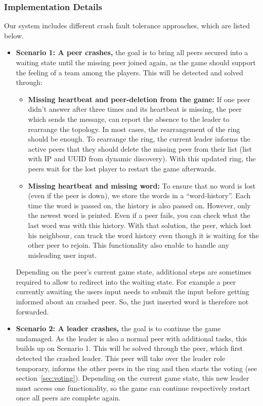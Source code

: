 \documentclass[runningheads]{llncs}
\begin{document}
            \subsubsection{Implementation Details}
            Our system includes different crash fault tolerance approaches, which are listed below.
            \begin{itemize}
                \item \textbf{Scenario 1: A peer crashes,} the goal is to bring all peers secured into a waiting state until the missing peer joined again, as the game should support the feeling of a team among the players. This will be detected and solved through:
                \begin{itemize}
                    \item \textbf{Missing heartbeat and peer-deletion from the game:} If one peer didn't answer after three times and its heartbeat is missing, the peer which sends the message, can report the absence to the leader to rearrange the topology. In most cases, the rearrangement of the ring should be enough. To rearrange the ring, the current leader informs the active peers that they should delete the missing peer from their list (list with IP and UUID from dynamic discovery). With this updated ring, the peers wait for the lost player to restart the game afterwards.
                    \item \textbf{Missing heartbeat and missing word:} To ensure that no word is lost (even if the peer is down), we store the words in a \enquote{word-history}. Each time the word is passed on, the history is also passed on. However, only the newest word is printed. Even if a peer fails, you can check what the last word was with this history. With that solution, the peer, which lost his neighbour, can track the word history even though it is waiting for the other peer to rejoin. This functionality also enable to handle any misleading user input.
                \end{itemize}
                Depending on the peer's current game state, additional steps are sometimes required to allow to redirect into the waiting state. For example a peer currently awaiting the users input needs to submit the input before getting informed about an crashed peer. So, the just inserted word is therefore not forwarded.
                \item \textbf{Scenario 2: A leader crashes,} the goal is to continue the game undamaged. As the leader is also a normal peer with additional tasks, this builds up on Scenario 1. This will be solved through the peer, which first detected the crashed leader. This peer will take over the leader role temporary, informs the other peers in the ring and then starts the voting (see section~\ref{sec:voting}). Depending on the current game state, this new leader must access one functionality, so the game can continue respectively restart once all peers are complete again.

\end{itemize}
\end{document}
